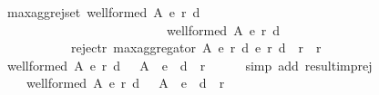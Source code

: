 \begin{isabellebody}
%
\isatagdocument
%
\isamarkuptrue%
%
\endisatagdocument
{\isafolddocument}%
%
\isadelimdocument
%
\endisadelimdocument
{}\isamarkupfalse%
\ max{\isacharunderscore}{\kern0pt}agg{\isacharunderscore}{\kern0pt}rej{\isacharunderscore}{\kern0pt}set{\isacharcolon}{\kern0pt}\ {\isachardoublequoteopen}{\isacharparenleft}{\kern0pt}well{\isacharunderscore}{\kern0pt}formed\ A\ {\isacharparenleft}{\kern0pt}e{}{\isacharcomma}{\kern0pt}\ r{}{\isacharcomma}{\kern0pt}\ d{}{\isacharparenright}{\kern0pt}\ {\isasymand}\isanewline
\ \ \ \ \ \ \ \ \ \ \ \ \ \ \ \ \ \ \ \ \ \ \ \ \ \ well{\isacharunderscore}{\kern0pt}formed\ A\ {\isacharparenleft}{\kern0pt}e{}{\isacharcomma}{\kern0pt}\ r{}{\isacharcomma}{\kern0pt}\ d{}{\isacharparenright}{\kern0pt}{\isacharparenright}{\kern0pt}\ {\isasymlongrightarrow}\isanewline
\ \ \ \ \ \ \ \ \ \ \ reject{\isacharunderscore}{\kern0pt}r\ {\isacharparenleft}{\kern0pt}max{\isacharunderscore}{\kern0pt}aggregator\ A\ {\isacharparenleft}{\kern0pt}e{}{\isacharcomma}{\kern0pt}\ r{}{\isacharcomma}{\kern0pt}\ d{}{\isacharparenright}{\kern0pt}\ {\isacharparenleft}{\kern0pt}e{}{\isacharcomma}{\kern0pt}\ r{}{\isacharcomma}{\kern0pt}\ d{}{\isacharparenright}{\kern0pt}{\isacharparenright}{\kern0pt}\ {\isacharequal}{\kern0pt}\ r{}\ {\isasyminter}\ r{}{\isachardoublequoteclose}\isanewline
%
\isadelimproof
%
\endisadelimproof
%
\isatagproof
{}\isamarkupfalse%
\ {\isacharminus}{\kern0pt}\isanewline
\ \ \isamarkupfalse%
\ {\isachardoublequoteopen}well{\isacharunderscore}{\kern0pt}formed\ A\ {\isacharparenleft}{\kern0pt}e{}{\isacharcomma}{\kern0pt}\ r{}{\isacharcomma}{\kern0pt}\ d{}{\isacharparenright}{\kern0pt}\ {\isasymlongrightarrow}\ \ A\ {\isacharminus}{\kern0pt}\ {\isacharparenleft}{\kern0pt}e{}\ {\isasymunion}\ d{}{\isacharparenright}{\kern0pt}\ {\isacharequal}{\kern0pt}\ r{}{\isachardoublequoteclose}\isanewline
\ \ \ \ \isamarkupfalse%
\ {\isacharparenleft}{\kern0pt}simp\ add{\isacharcolon}{\kern0pt}\ result{\isacharunderscore}{\kern0pt}imp{\isacharunderscore}{\kern0pt}rej{\isacharparenright}{\kern0pt}\isanewline
\ \ \isamarkupfalse%
\ \isamarkupfalse%
\isanewline
\ \ \ \ {\isachardoublequoteopen}well{\isacharunderscore}{\kern0pt}formed\ A\ {\isacharparenleft}{\kern0pt}e{}{\isacharcomma}{\kern0pt}\ r{}{\isacharcomma}{\kern0pt}\ d{}{\isacharparenright}{\kern0pt}\ {\isasymlongrightarrow}\ \ A\ {\isacharminus}{\kern0pt}\ {\isacharparenleft}{\kern0pt}e{}\ {\isasymunion}\ d{}{\isacharparenright}{\kern0pt}\ {\isacharequal}{\kern0pt}\ r{}{\isachardoublequoteclose}\isanewline

\end{isabellebody}
